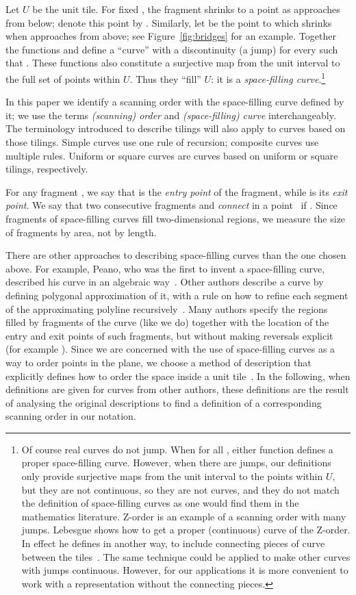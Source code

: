 \documentclass[11pt,a4paper]{article}
\newcommand{\unittile}{\ensuremath{U}\xspace}
\begin{document}
Let \unittile be the unit tile. For fixed , the fragment  shrinks to a point as  approaches  from below; denote this point by . Similarly, let  be the point to which  shrinks when  approaches  from above; see Figure~\ref{fig:bridges} for an example. Together the functions  and  define a ``curve'' with a discontinuity (a jump) for every  such that . These functions also constitute a surjective map from the unit interval to the full set of points within \unittile. Thus they ``fill'' \unittile: it is a \emph{space-filling curve}.\footnote{Of course real curves do not jump. When  for all , either function defines a proper space-filling curve. However, when there are jumps, our definitions only provide surjective maps from the unit interval to the points within \unittile, but they are not continuous, so they are not curves, and they do not match the definition of space-filling curves as one would find them in the mathematics literature. Z-order is an example of a scanning order with many jumps. Lebesgue shows how to get a proper (continuous) curve of the Z-order. In effect he defines  in another way, to include connecting pieces of curve between the tiles~\cite{Lebesgue1904}. The same technique could be applied to make other curves with jumps continuous. However, for our applications it is more convenient to work with a representation without the connecting pieces.}

In this paper we identify a scanning order with the space-filling curve defined by it; we use the terms \emph{(scanning) order} and \emph{(space-filling) curve} interchangeably. The terminology introduced to describe tilings will also apply to curves based on those tilings. Simple curves use one rule of recursion; composite curves use multiple rules. Uniform or square curves are curves based on uniform or square tilings, respectively.

For any fragment , we say that  is the \emph{entry point} of the fragment, while  is its \emph{exit point}. We say that two consecutive fragments  and  \emph{connect} in a point~ if . Since fragments of space-filling curves fill two-dimensional regions, we measure the size of fragments by area, not by length.

There are other approaches to describing space-filling curves than the one chosen above. For example, Peano, who was the first to invent a space-filling curve, described his curve in an algebraic way~\cite{Peano1890}. Other authors describe a curve by defining polygonal approximation of it, with a rule on how to refine each segment of the approximating polyline recursively~\cite{Gardner1976}. Many authors specify the regions filled by fragments of the curve (like we do) together with the location of the entry and exit points of such fragments, but without making reversals explicit (for example \cite{Asano1997,Sagan1994,Wierum2002}). Since we are concerned with the use of space-filling curves as a way to order points in the plane, we choose a method of description that explicitly defines how to order the space inside a unit tile~\cite{Haverkort2009}.
In the following, when definitions are given for curves from other authors, these definitions are the result of analysing the original descriptions to find a definition of a corresponding scanning order in our notation.
\end{document}

